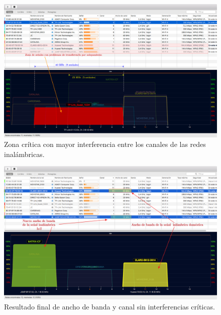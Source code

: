 
\begin{landscape} %
\begin{figure}[htpb]
\centering 
\includegraphics[width=1.5\textwidth]{./Figures/04.png}
\caption{Zona crítica con mayor interferencia entre los canales de las redes inalámbricas.}
\label{fig:test04}
\end{figure}
\end{landscape} %



\begin{landscape} %
\begin{figure}[htpb]
\centering 
\includegraphics[width=1.5\textwidth]{./Figures/wifi/05.png}
\caption{Resultado final de ancho de banda y canal sin interferencias críticas.}
\label{fig:test05}
\end{figure}
\end{landscape} %



